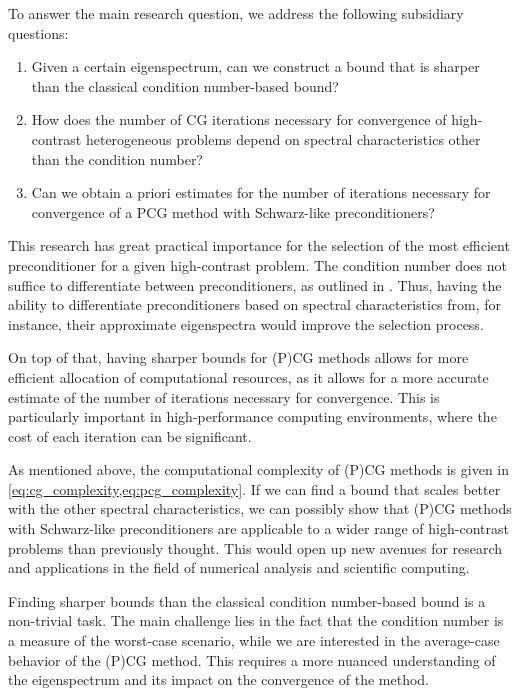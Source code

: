 \begin{subsidiaryq} \label{rq:subsidiaries}
    To answer the main research question, we address the following subsidiary questions:
    \setlength\itemindent{1in}
    \begin{enumerate}[label=\textbf{Q\arabic*}, ref=\textbf{Q\arabic*}, leftmargin=1cm]
        \item\label{rq:subsidiary:heuristic} Given a certain eigenspectrum, can we construct a bound that is sharper than the classical condition number-based bound?
        \item\label{rq:subsidiary:measures} How does the number of CG iterations necessary for convergence of high-contrast heterogeneous problems depend on spectral characteristics other than the condition number?
        \item\label{rq:subsidiary:preconditioners} Can we obtain a priori estimates for the number of iterations necessary for convergence of   a PCG method with Schwarz-like preconditioners?
    \end{enumerate}
\end{subsidiaryq}

This research has great practical importance for the selection of the most efficient preconditioner for a given high-contrast problem. The condition number does not suffice to differentiate between preconditioners, as outlined in \cite{ams_coarse_space_comp_study_Alves2024}. Thus, having the ability to differentiate preconditioners based on spectral characteristics from, for instance, their approximate eigenspectra would improve the selection process.

On top of that, having sharper bounds for (P)CG methods allows for more efficient allocation of computational resources, as it allows for a more accurate estimate of the number of iterations necessary for convergence. This is particularly important in high-performance computing environments, where the cost of each iteration can be significant.

As mentioned above, the computational complexity of (P)CG methods is given in \cref{eq:cg_complexity,eq:pcg_complexity}. If we can find a bound that scales better with the other spectral characteristics, we can possibly show that (P)CG methods with Schwarz-like preconditioners are applicable to a wider range of high-contrast problems than previously thought. This would open up new avenues for research and applications in the field of numerical analysis and scientific computing.

Finding sharper bounds than the classical condition number-based bound is a non-trivial task. The main challenge lies in the fact that the condition number is a measure of the worst-case scenario, while we are interested in the average-case behavior of the (P)CG method. This requires a more nuanced understanding of the eigenspectrum and its impact on the convergence of the method.

